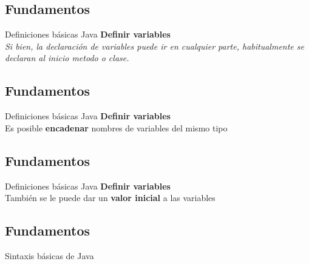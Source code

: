 \subsection{Fundamentos}
\begin{frame}{Definiciones básicas Java}
\textbf{Definir variables}\\

{\textit{Si bien, la declaración de variables puede ir en cualquier parte, habitualmente se declaran al inicio metodo o clase.}}
\end{frame}

\subsection{Fundamentos}
\begin{frame}{Definiciones básicas Java}
\textbf{Definir variables}\\
Es posible {\textbf{encadenar}} nombres de variables del mismo tipo

\end{frame}

\subsection{Fundamentos}
\begin{frame}{Definiciones básicas Java}
\textbf{Definir variables}\\
También se le puede dar un {\textbf{valor inicial}} a las variables

\end{frame}

\subsection{Fundamentos}
\begin{frame}{Sintaxis básicas de Java}
\end{frame}

